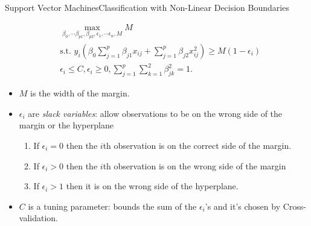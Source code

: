 \begin{frame}{Support Vector Machines}{Classification with Non-Linear Decision Boundaries}

    \begin{align*}
        & \max_{\beta_0, \cdots \beta_{p1}, \beta_{p2}, \epsilon_1, \cdots \epsilon_n, M} M \\ 
        & \text{s.t. } y_i \left(  \beta_0 \sum_{j=1}^p \beta_{j1} x_{ij}  + \sum_{j=1}^p \beta_{j2} x^2_{ij}  \right) \geq M(1-\epsilon_i) \\
        & \epsilon_i \leq C, \epsilon_i \geq 0, \sum_{j=1}^p \sum_{k=1}^2 \beta_{jk}^2 = 1.  
    \end{align*} \pause 

    \begin{itemize}
    \item $M$ is the width of the margin.  \pause  
    \item $\epsilon_i$ are \textit{slack variables}: allow observations to be on the wrong side of the margin or the hyperplane \pause
    \begin{enumerate}
        \item If $\epsilon_i = 0$ then the $i$th observation is on the correct side of the margin. \pause 
        \item If $\epsilon_i > 0$ then the $i$th observation is on the wrong side of the margin \pause 
        \item If $\epsilon_i > 1$ then it is on the wrong side of the hyperplane. \pause 
    \end{enumerate}
    \item $C$ is a tuning parameter: bounds the sum of the $\epsilon_i$'s and it's chosen by Cross-validation.  

    \end{itemize}


    
\end{frame}

